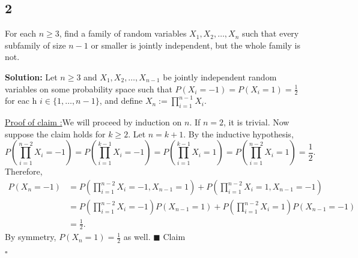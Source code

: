 \documentclass[12pt]{article}
\newcounter{ProofCounter}
\newcounter{ClaimCounter}[ProofCounter]
\newenvironment{Solution}{\stepcounter{ProofCounter}\textbf{Solution:}}{\hfill$\square$}
\newenvironment{claim}[1]{\vspace{1mm}\stepcounter{ClaimCounter}\par\noindent\underline{\bf Claim \theClaimCounter:}\space#1}{}
\newenvironment{claimproof}[1]{\par\noindent\underline{Proof of claim \theClaimCounter:}\space#1}{\hfill $\blacksquare$ Claim \theClaimCounter}
\begin{document}

\subsection*{2}
\begin{tcolorbox}
  For each $n \geq 3$, find a family of random variables $X_1, X_2, \dots, X_n$ such that every subfamily of size $n - 1$ or smaller is jointly independent, but the whole family is not.
\end{tcolorbox}
\begin{Solution}
  Let $n\geq 3$ and $X_1, X_2, \dots, X_{n-1}$ be jointly independent random variables on some probability space such that $P(X_i = -1) = P(X_i = 1) = \frac{1}{2}$ for eac h $ i \in \{1, \dots, n-1 \}$, and define $X_n := \prod_{i=1}^{n-1}X_i$.

  \begin{claimproof}
    We will proceed by induction on $n$. If $n = 2$, it is trivial. Now suppose the claim holds for $k \geq 2$. Let $n = k + 1$. By the inductive hypothesis,
    \[
      P \left( \prod_{i=1}^{n-2}X_i = -1 \right) = P \left( \prod_{i=1}^{k-1}X_i = -1 \right) = P \left( \prod_{i=1}^{k-1}X_i = 1 \right) = P \left( \prod_{i=1}^{n-2}X_i = 1 \right) = \frac{1}{2}.
    \]
    Therefore,
    \begin{align*}
      P(X_n = -1) & = P \left( \prod_{i=1}^{n-2}X_i = -1, X_{n-1} = 1 \right) + P \left( \prod_{i=1}^{n-2}X_i = 1, X_{n-1} = -1 \right) \\
      & = P \left( \prod_{i=1}^{n-2}X_i = -1 \right)P(X_{n-1} = 1) + P \left( \prod_{i=1}^{n-2}X_i = 1 \right)P(X_{n-1} = -1) \\
      & = \frac{1}{2}.
    \end{align*}
    By symmetry, $P(X_n = 1) = \frac{1}{2}$ as well.
  \end{claimproof}


\end{Solution}
\end{document}
